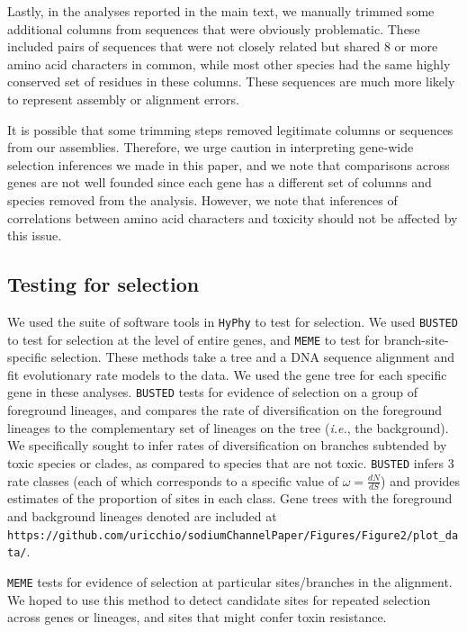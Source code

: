 \documentclass{article}
\begin{document}
Lastly, in the analyses reported in the main text, we manually trimmed some additional columns from sequences that were obviously problematic. These included pairs of sequences that were not closely related but shared 8 or more amino acid characters in common, while most other species had the same highly conserved set of residues in these columns. These sequences are much more likely to represent assembly or alignment errors. 

It is possible that some trimming steps removed legitimate columns or sequences from our assemblies. Therefore, we urge caution in interpreting gene-wide selection inferences we made in this paper, and we note that comparisons across genes are not well founded since each gene has a different set of columns and species removed from the analysis. However, we note that inferences of correlations between amino acid characters and toxicity should not be affected by this issue.   

\subsection*{Testing for selection}

We used the suite of software tools in \texttt{HyPhy} \citep{pond2005hyphy} to test for selection. We used \texttt{BUSTED} \cite{murrell2015gene} to test for selection at the level of entire genes, and \texttt{MEME} \citep{murrell2012detecting} to test for branch-site-specific selection. These methods take a tree and a DNA sequence alignment and fit evolutionary rate models to the data. We used the gene tree for each specific gene in these analyses. \texttt{BUSTED} tests for evidence of selection on a group of foreground lineages, and compares the rate of diversification on the foreground lineages to the complementary set of lineages on the tree (\textit{i.e.}, the background). We specifically sought to infer rates of diversification on branches subtended by toxic species or clades, as compared to species that are not toxic. \texttt{BUSTED} infers 3 rate classes (each of which corresponds to a specific value of $\omega=\frac{dN}{dS}$) and provides estimates of the proportion of sites in each class. Gene trees with the foreground and background lineages denoted are included at \texttt{https://github.com/uricchio/sodiumChannelPaper/Figures/Figure2/plot\_data/}.

\texttt{MEME} tests for evidence of selection at particular sites/branches in the alignment. We hoped to use this method to detect candidate sites for repeated selection across genes or lineages, and sites that might confer toxin resistance.
\end{document}
